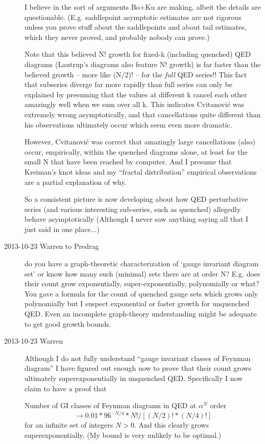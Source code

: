 \begin{description}
I believe in the sort of arguments Bo+Ku are making, albeit the
details are questionable.
(E.g. saddlepoint asymptotic estimates are not rigorous unless you prove stuff
about the saddlepoints and about tail estimates, which they never proved, and
probably nobody can prove.)

Note that this believed N! growth for fixed-k (including quenched) QED diagrams
(Lautrup's diagrams also feature N! growth) is far faster than the
believed growth -- more like (N/2)! -- for the \emph{full} QED series!!
This fact that subseries diverge far more rapidly than full series
can only be explained by presuming that
the values at different k cancel each other amazingly well when we sum
over all k.
This indicates Cvitanovi\'c was extremely wrong asymptotically, and that
cancellations
quite different than his observations ultimately occur which seem even
more dramatic.

However, Cvitanovi\'c was correct that amazingly large cancellations
(also) occur, empirically, within the quenched diagrams alone, at least
for the small N that have been reached by computer.   And I presume that
Kreiman's knot ideas and my ``fractal distribution''
empirical observations are a partial explanation of why.

So a consistent picture is now developing about how QED perturbative series (and
various interesting sub-series, such as quenched) allegedly behave
asymptotically
(Although I never saw anything saying all that I just said in one place...)

\item[2013-10-23  Warren to Predrag]  do you have a graph-theoretic
characterization of `gauge invariant diagram set' or know how many such
(minimal) sets there are at order N?   E.g. does their count grow
exponentially, super-exponentially, polynomially or what?  You gave a
formula for the count of quenched gauge sets which grows only polynomially
but I suspect exponential or faster growth for unquenched QED.  Even an
incomplete graph-theory understanding might be adequate to get good growth
bounds.

\item[2013-10-23 Warren]
Although I do not fully understand ``gauge invariant classes of Feynman diagram''
I have figured out enough now to prove that their count grows
ultimately superexponentially in unquenched QED.  Specifically I now
claim to have a proof that

  Number of GI classes of Feynman diagrams in QED at $\alpha^N$ order
\[
  \to 0.01 *  96^{-N/4} * N! / [ (N/2)! * (N/4)! ]
\]
for an infinite set of integers $N>0$.
And this clearly grows superexponentially.
(My bound is very unlikely to be optimal.)


\end{description}
